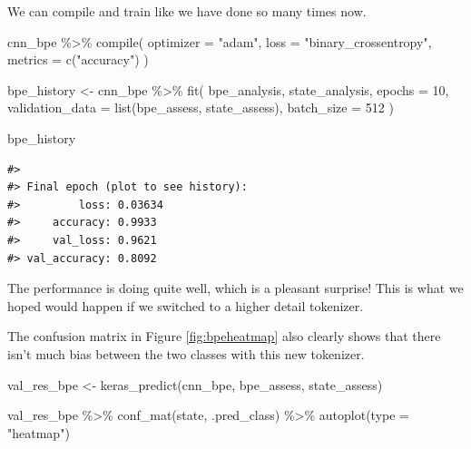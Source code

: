 \documentclass[
]{krantz}
\makeatletter
\newenvironment{Shaded}{\begin{snugshade}}{\end{snugshade}}
\newcommand{\AttributeTok}[1]{\textcolor[rgb]{0.77,0.63,0.00}{#1}}
\newcommand{\DecValTok}[1]{\textcolor[rgb]{0.00,0.00,0.81}{#1}}
\newcommand{\FunctionTok}[1]{\textcolor[rgb]{0.00,0.00,0.00}{#1}}
\newcommand{\NormalTok}[1]{#1}
\newcommand{\OtherTok}[1]{\textcolor[rgb]{0.56,0.35,0.01}{#1}}
\newcommand{\SpecialCharTok}[1]{\textcolor[rgb]{0.00,0.00,0.00}{#1}}
\newcommand{\StringTok}[1]{\textcolor[rgb]{0.31,0.60,0.02}{#1}}
\newenvironment{kframe}{%
\medskip{}
\setlength{\fboxsep}{.8em}
 \def\at@end@of@kframe{}%
 \ifinner\ifhmode%
  \def\at@end@of@kframe{\end{minipage}}%
  \begin{minipage}{\columnwidth}%
 \fi\fi%
 \def\FrameCommand##1{\hskip\@totalleftmargin \hskip-\fboxsep
 \colorbox{shadecolor}{##1}\hskip-\fboxsep
     \hskip-\linewidth \hskip-\@totalleftmargin \hskip\columnwidth}%
 \MakeFramed {\advance\hsize-\width
   \@totalleftmargin\z@ \linewidth\hsize
   \@setminipage}}%
 {\par\unskip\endMakeFramed%
 \at@end@of@kframe}
\renewenvironment{Shaded}{\begin{kframe}}{\end{kframe}}
\makeatother
\begin{document}
We can compile and train like we have done so many times now.

\begin{Shaded}
\begin{Highlighting}[]
\NormalTok{cnn\_bpe }\SpecialCharTok{\%\textgreater{}\%} \FunctionTok{compile}\NormalTok{(}
  \AttributeTok{optimizer =} \StringTok{"adam"}\NormalTok{,}
  \AttributeTok{loss =} \StringTok{"binary\_crossentropy"}\NormalTok{,}
  \AttributeTok{metrics =} \FunctionTok{c}\NormalTok{(}\StringTok{"accuracy"}\NormalTok{)}
\NormalTok{)}

\NormalTok{bpe\_history }\OtherTok{\textless{}{-}}\NormalTok{ cnn\_bpe }\SpecialCharTok{\%\textgreater{}\%} \FunctionTok{fit}\NormalTok{(}
\NormalTok{  bpe\_analysis,}
\NormalTok{  state\_analysis,}
  \AttributeTok{epochs =} \DecValTok{10}\NormalTok{,}
  \AttributeTok{validation\_data =} \FunctionTok{list}\NormalTok{(bpe\_assess, state\_assess),}
  \AttributeTok{batch\_size =} \DecValTok{512}
\NormalTok{)}

\NormalTok{bpe\_history}
\end{Highlighting}
\end{Shaded}

\begin{verbatim}
#> 
#> Final epoch (plot to see history):
#>         loss: 0.03634
#>     accuracy: 0.9933
#>     val_loss: 0.9621
#> val_accuracy: 0.8092
\end{verbatim}

The performance is doing quite well, which is a pleasant surprise! This is what we hoped would happen if we switched to a higher detail tokenizer.

The confusion matrix in Figure \ref{fig:bpeheatmap} also clearly shows that there isn't much bias between the two classes with this new tokenizer.

\begin{Shaded}
\begin{Highlighting}[]
\NormalTok{val\_res\_bpe }\OtherTok{\textless{}{-}} \FunctionTok{keras\_predict}\NormalTok{(cnn\_bpe, bpe\_assess, state\_assess)}

\NormalTok{val\_res\_bpe }\SpecialCharTok{\%\textgreater{}\%}
  \FunctionTok{conf\_mat}\NormalTok{(state, .pred\_class) }\SpecialCharTok{\%\textgreater{}\%}
  \FunctionTok{autoplot}\NormalTok{(}\AttributeTok{type =} \StringTok{"heatmap"}\NormalTok{)}
\end{Highlighting}
\end{Shaded}
\end{document}
